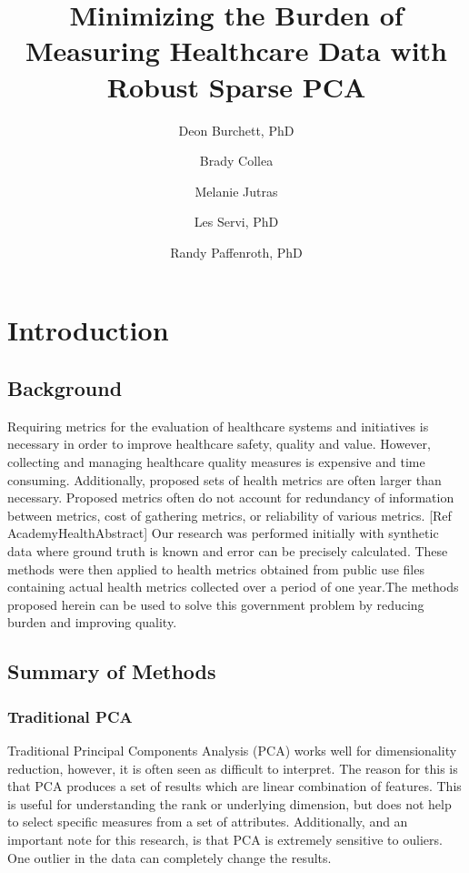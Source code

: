 \documentclass{article}
\author[1]{Deon Burchett, PhD}
\author[2]{Brady Collea}
\author[3]{Melanie Jutras}
\author[4]{Les Servi, PhD}
\author[5]{Randy Paffenroth, PhD}
\affil[1,2,3,4]{The MITRE Corporation}
\affil[5]{Worcester Polytechnic Institute}
\title{Minimizing the Burden of Measuring Healthcare Data with Robust Sparse PCA}
\date{}
\begin{document}
\maketitle

\section{Introduction}
\subsection{Background}
Requiring metrics for the evaluation of healthcare systems and initiatives is necessary in order to improve healthcare safety, quality and value. However, collecting and managing healthcare quality measures is expensive and time consuming. Additionally,  proposed sets of health metrics are often larger than necessary. Proposed metrics often do not account for redundancy of information between metrics, cost of gathering metrics, or reliability of various metrics. [Ref AcademyHealthAbstract]  Our research was performed initially with synthetic data where ground truth is known and error can be precisely calculated. These methods were then applied to health metrics obtained from public use files containing actual health metrics collected over a period of one year.The methods proposed herein can be used to solve this government problem by reducing burden and improving quality.
\subsection{Summary of Methods}
\subsubsection{Traditional PCA}
Traditional Principal Components Analysis (PCA) works well for dimensionality reduction, however, it is often seen as difficult to interpret.  The reason for this is that PCA produces a set of results which are linear combination of features.  This is useful for understanding the rank or underlying dimension, but does not help to select specific measures from a set of attributes. Additionally, and an important note for this research, is that PCA is extremely sensitive to ouliers.  One outlier in the data can completely change the results.
\end{document}
